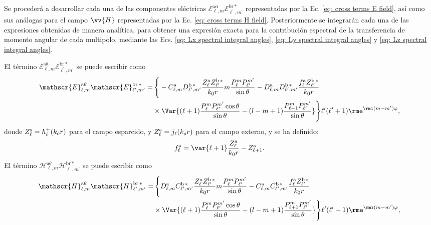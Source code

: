 Se procederá a desarrollar cada una de las componentes eléctricas $\mathscr{E}_{\ell, m}^{\text{a}\alpha}\mathscr{E}_{\ell^{\prime}, m^{\prime}}^{\text{br}\,*}$ representadas por la Ec. \eqref{eq: cross terms E field}, así como sus análogas para el campo $\vv{H}$ representadas por la Ec. \eqref{eq: cross terms H field}. Posteriormente se integrarán cada una de las expresiones obtenidas de manera analítica, para obtener una expresión exacta para la contribución espectral de la transferencia de momento angular de cada multipolo, mediante las Ecs. \eqref{eq: Lx spectral integral angles}, \eqref{eq: Ly spectral integral angles} y \eqref{eq: Lz spectral integral angles}.

El término $\mathscr{E}_{\ell, m}^{\text{a}\theta}\mathscr{E}_{\ell^{\prime}, m^{\prime}}^{\text{br}\,*}$ se puede escribir como
\begin{align}
\mathscr{E}_{\ell, m}^{\text{a}\theta}\mathscr{E}_{\ell^{\prime}, m^{\prime}}^{\text{br}\,*}=& \, \Bigg\{-C_{\ell,m}^{\rm a}D_{\ell^{\prime}, m^{\prime}}^{\rm b \, *}\frac{Z_{\ell}^{\rm a}Z_{\ell^{\prime}}^{\rm b\, *}}{k_0 r} m \frac{P_{\ell}^{m}P_{\ell^{\prime}}^{m^{\prime}}}{\sin\theta}-D_{\ell, m}^{\rm a}D_{\ell^{\prime}, m^{\prime}}^{\rm b \, *} \frac{f_{\ell}^{\rm a}Z_{\ell^{\prime}}^{\rm b \, *}}{k_0 r}\nonumber\\
& \times \Var{(\ell+1) \frac{P_{\ell}^m P_{\ell^{\prime}}^{m^{\prime}}\cos\theta}{\sin\theta}-(l-m+1)\frac{P_{\ell+1}^{m}P_{\ell^{\prime}}^{m^{\prime}}}{\sin\theta}}\Bigg\}\ell^{\prime}(\ell^{\prime}+1)  \rme^{\rmi (m-m^{\prime})\varphi },
\end{align}
donde $Z_{\ell}^{\rm s}=h_{\ell}^{+}(k_o r)$ para el campo esparcido, y $Z_{\ell}^{\rm e}=j_{\ell}(k_o r)$ para el campo externo, y se ha definido:
\begin{equation}
f_{\ell}^{\rm a}= \var{\ell + 1} \frac{Z_{\ell}^{\rm a}}{k_0 r}-Z_{\ell+1}^{\rm a}.
\end{equation}
%
El término $\mathscr{H}_{\ell, m}^{\text{a}\theta}\mathscr{H}_{\ell^{\prime}, m^{\prime}}^{\text{br}\,*}$ se puede escribir como
\begin{align}
\mathscr{H}_{\ell, m}^{\text{a}\theta}\mathscr{H}_{\ell^{\prime}, m^{\prime}}^{\text{br}\,*}=& \, \Bigg\{ D_{\ell,m}^{\rm a}C_{\ell^{\prime}, m^{\prime}}^{\rm b \, *}\frac{Z_{\ell}^{\rm a}Z_{\ell^{\prime}}^{\rm b\, *}}{k_0 r} m \frac{P_{\ell}^{m}P_{\ell^{\prime}}^{m^{\prime}}}{\sin\theta}-C_{\ell, m}^{\rm a}C_{\ell^{\prime}, m^{\prime}}^{\rm b \, *} \frac{f_{\ell}^{\rm a}Z_{\ell^{\prime}}^{\rm b \, *}}{k_0 r}\nonumber\\
& \times \Var{(\ell+1) \frac{P_{\ell}^m P_{\ell^{\prime}}^{m^{\prime}}\cos\theta}{\sin\theta}-(l-m+1)\frac{P_{\ell+1}^{m}P_{\ell^{\prime}}^{m^{\prime}}}{\sin\theta}}\Bigg\}\ell^{\prime}(\ell^{\prime}+1)  \rme^{\rmi (m-m^{\prime})\varphi },
\end{align}
